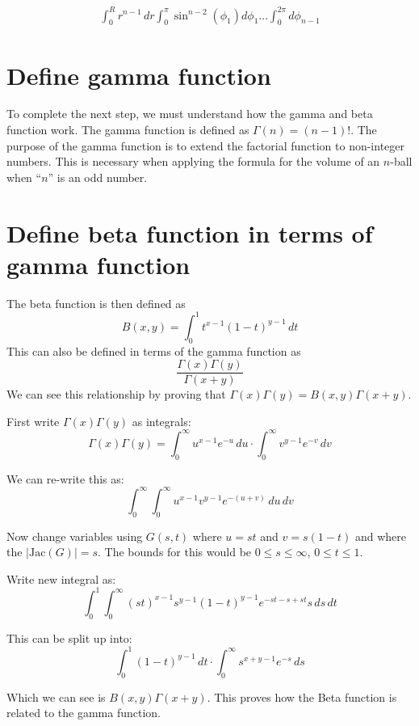 \documentclass{article}
\begin{document}
\begin{align*}
    \int_{0}^{R}r^{n-1}\,dr\int_{0}^{\pi}\sin^{n-2}(\phi_1)d\phi_1\dots\int_{0}^{2\pi}d\phi_{n-1}
\end{align*}








\section*{Define gamma function}
To complete the next step, we must understand how the gamma and beta function work. The gamma function is defined as $\Gamma(n) = (n-1)!$. The purpose of the gamma function is to extend the factorial function to non-integer numbers. This is necessary when applying the formula for the volume of an $n$-ball when ``$n$'' is an odd number.

\section*{Define beta function in terms of gamma function}
The beta function is then defined as 
\[
B(x,y) = \int_0^1 t^{x-1}(1-t)^{y-1}\,dt
\]
This can also be defined in terms of the gamma function as
\[
\frac{\Gamma(x)\Gamma(y)}{\Gamma(x+y)}
\]
We can see this relationship by proving that $\Gamma(x)\Gamma(y) = B(x,y)\Gamma(x+y)$.

First write $\Gamma(x)\Gamma(y)$ as integrals:
\[
\Gamma(x)\Gamma(y) = \int_0^\infty u^{x-1}e^{-u}\,du \cdot \int_0^\infty v^{y-1}e^{-v}\,dv
\]

We can re-write this as:
\[
\int_0^\infty\int_0^\infty u^{x-1}v^{y-1}e^{-(u+v)}\,du\,dv
\]

Now change variables using $G(s,t)$ where $u=st$ and $v=s(1-t)$ and where the $|\text{Jac}(G)| = s$. The bounds for this would be $0\leq s\leq\infty$, $0\leq t\leq 1$.

Write new integral as:
\[
\int_0^1\int_0^\infty (st)^{x-1}s^{y-1}(1-t)^{y-1}e^{-st-s+st}s\,ds\,dt
\]

This can be split up into:
\[
\int_0^1(1-t)^{y-1}\,dt \cdot \int_0^\infty s^{x+y-1}e^{-s}\,ds
\]

Which we can see is $B(x,y)\Gamma(x+y)$. This proves how the Beta function is related to the gamma function.
\end{document}
